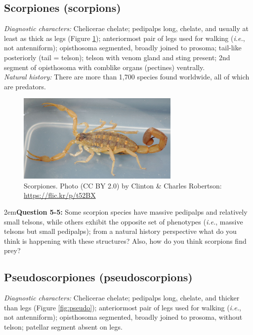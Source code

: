 \documentclass[letterpaper, 11pt]{article}
\begin{document}
\FloatBarrier
\subsection{Scorpiones (scorpions)}
\noindent{}\textit{Diagnostic characters:} Chelicerae chelate; pedipalps long, chelate, and usually at least as thick as legs (Figure \ref{fig:scorpion}); anteriormost pair of legs used for walking (\textit{i.e.}, not antenniform); opisthosoma segmented, broadly joined to prosoma; tail-like posteriorly (tail = telson); telson with venom gland and sting present; 2nd segment of opisthosoma with comblike organs (pectines) ventrally.\\

\noindent{}\textit{Natural history:} There are more than 1,700 species found worldwide, all of which are predators.\\

\begin{figure}[ht!]
  \centering
    \includegraphics[width=0.7\textwidth]{scorpion}
  \caption{Scorpiones. Photo (CC BY 2.0) by Clinton \& Charles Robertson: \url{https://flic.kr/p/t52BX}}
  \label{fig:scorpion}
\end{figure}
\hangindent2em\textbf{Question 5-5:} Some scorpion species have massive pedipalps and relatively small telsons, while others exhibit the opposite set of phenotypes (\textit{i.e.}, massive telsons but small pedipalps); from a natural history perspective what do you think is happening with these structures? Also, how do you think scorpions find prey?\vspace{5cm}

\subsection{Pseudoscorpiones (pseudoscorpions)}
\noindent{}\textit{Diagnostic characters:} Chelicerae chelate; pedipalps long, chelate, and thicker than legs (Figure \ref{fig:pseudo}); anteriormost pair of legs used for walking (\textit{i.e.}, not antenniform); opisthosoma segmented, broadly joined to prosoma, without telson; patellar segment absent on legs.\\
\end{document}
